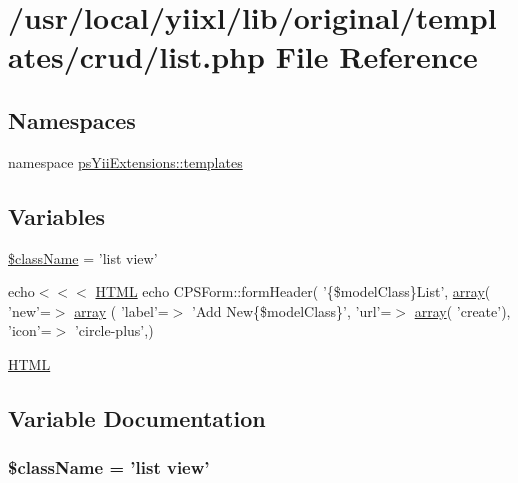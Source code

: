 \hypertarget{list_8php}{
\section{/usr/local/yiixl/lib/original/templates/crud/list.php File Reference}
\label{list_8php}
}
\subsection*{Namespaces}
\begin{DoxyCompactItemize}
\item 
namespace \hyperlink{namespacepsYiiExtensions_1_1templates}{psYiiExtensions::templates}
\end{DoxyCompactItemize}
\subsection*{Variables}
\begin{DoxyCompactItemize}
\item 
\hyperlink{list_8php_acd6a475a6eeb092f4eea3e19e502d67d}{\$className} = 'list view'
\item 
echo$<$$<$$<$ \hyperlink{module_8php_a2c8135527015cd4586959ac7c2ffec92}{HTML} echo CPSForm::formHeader( '\{\$modelClass\}List', \hyperlink{list_8php_aa3205d038c7f8feb5c9f01ac4dfadc88}{array}( 'new'=$>$ \hyperlink{list_8php_aa3205d038c7f8feb5c9f01ac4dfadc88}{array} ( 'label'=$>$ 'Add New\{\$modelClass\}', 'url'=$>$ \hyperlink{list_8php_aa3205d038c7f8feb5c9f01ac4dfadc88}{array}( 'create'), 'icon'=$>$ 'circle-\/plus',)
\item 
\hyperlink{list_8php_a2c8135527015cd4586959ac7c2ffec92}{HTML}
\end{DoxyCompactItemize}


\subsection{Variable Documentation}
\hypertarget{list_8php_acd6a475a6eeb092f4eea3e19e502d67d}{
\subsubsection[{\$className}]{\setlength{\rightskip}{0pt plus 5cm}\$className = 'list view'}}
\label{list_8php_acd6a475a6eeb092f4eea3e19e502d67d}


